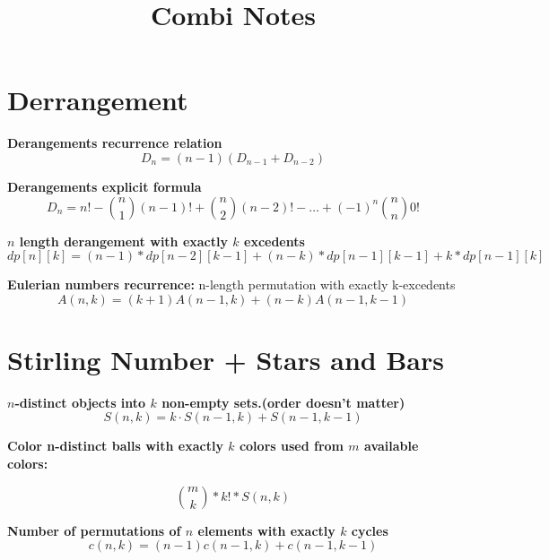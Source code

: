 \documentclass{article}
\begin{document}
\title{\textbf{Combi Notes}}
\date{}
\maketitle

\section*{Derrangement}

\textbf{Derangements recurrence relation}
\[
D_n = (n - 1)(D_{n-1} + D_{n-2})
\]

\textbf{Derangements explicit formula}
\[
D_n = n! - \binom{n}{1}(n - 1)! + \binom{n}{2}(n - 2)! - \dots + (-1)^n \binom{n}{n} 0!
\]

\textbf{ $n$ length derangement with exactly $k$ excedents}
\[
dp[n][k] = (n - 1) * dp[n - 2][k - 1] + (n - k) * dp[n - 1][k - 1] + k * dp[n - 1][k]
\]

\textbf{Eulerian numbers recurrence:} n-length permutation with exactly k-excedents
\[
A(n, k) = (k + 1)A(n - 1, k) + (n - k)A(n - 1, k - 1)
\]

\section*{Stirling Number + Stars and Bars}

\textbf{$n$-distinct objects into $k$ non-empty sets.(order doesn't matter)}
\[
S(n, k) = k \cdot S(n - 1, k) + S(n - 1, k - 1)
\]

\textbf{Color n-distinct balls with exactly \(k\) colors used from \(m\) available colors:}

\[
\binom{m}{k} * k! * S(n,k)
\]

\textbf{Number of permutations of $n$ elements with exactly $k$ cycles}
\[
c(n, k) = (n - 1)c(n - 1, k) + c(n - 1, k - 1)
\]
\end{document}
